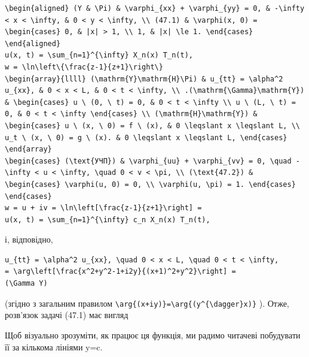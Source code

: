\documentclass[
  ukrainian,
]{article}
\begin{document}
\begin{verbatim}
\begin{aligned} (Y & \Pi) & \varphi_{xx} + \varphi_{yy} = 0, & -\infty < x < \infty, & 0 < y < \infty, \\ (47.1) & \varphi(x, 0) = \begin{cases} 0, & |x| > 1, \\ 1, & |x| \le 1. \end{cases} \end{aligned}
u(x, t) = \sum_{n=1}^{\infty} X_n(x) T_n(t),
w = \ln\left\{\frac{z-1}{z+1}\right\}
\begin{array}{llll} (\mathrm{Y}\mathrm{H}\Pi) & u_{tt} = \alpha^2 u_{xx}, & 0 < x < L, & 0 < t < \infty, \\ .(\mathrm{\Gamma}\mathrm{Y}) & \begin{cases} u \ (0, \ t) = 0, & 0 < t < \infty \\ u \ (L, \ t) = 0, & 0 < t < \infty \end{cases} \\ (\mathrm{H}\mathrm{Y}) & \begin{cases} u \ (x, \ 0) = f \ (x), & 0 \leqslant x \leqslant L, \\ u_t \ (x, \ 0) = g \ (x). & 0 \leqslant x \leqslant L, \end{cases} \end{array}
\begin{cases} (\text{УЧП}) & \varphi_{uu} + \varphi_{vv} = 0, \quad -\infty < u < \infty, \quad 0 < v < \pi, \\ (\text{47.2}) & \begin{cases} \varphi(u, 0) = 0, \\ \varphi(u, \pi) = 1. \end{cases} \end{cases}
w = u + iv = \ln\left[\frac{z-1}{z+1}\right] =
u(x, t) = \sum_{n=1}^{\infty} c_n X_n(x) T_n(t),
\end{verbatim}

і, відповідно,

\begin{verbatim}
u_{tt} = \alpha^2 u_{xx}, \quad 0 < x < L, \quad 0 < t < \infty,
= \arg\left[\frac{x^2+y^2-1+i2y}{(x+1)^2+y^2}\right] =
(\Gamma Y)
\end{verbatim}

(згідно з загальним правилом
\texttt{\textbackslash{}arg\{(x+iy)\}=\textbackslash{}arg\{(y\^{}\{\textbackslash{}dagger\}x)\}}
). Отже, розв'язок задачі (47.1) має вигляд

Щоб візуально зрозуміти, як працює ця функція, ми радимо читачеві
побудувати її за кількома лініями y=c.
\end{document}
